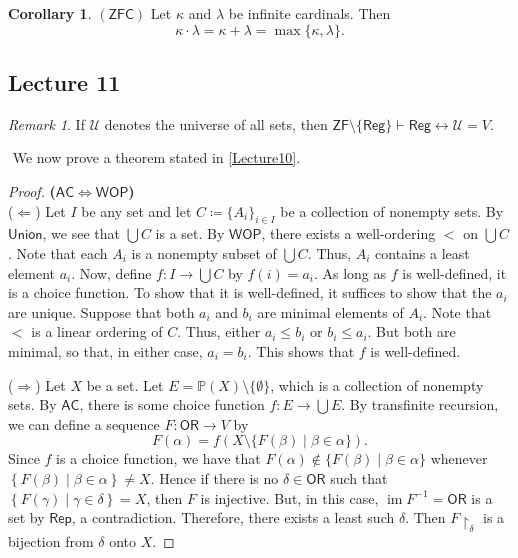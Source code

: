 \documentclass[10pt,letterpaper,cm]{nupset}
\theoremstyle{definition}
\theoremstyle{theorem}
\newtheorem{corollary}[definition]{Corollary}
\theoremstyle{remark}
\newtheorem{remark}[definition]{Remark}
\newcommand{\U}{\mathcal U}
\renewcommand{\P}{\mathbb P}
\newcommand{\1}{\mathbf{1}}
\newcommand{\0}{\vec 0}
\newcommand{\zf}{\mathsf{ZF}}
\newcommand{\zfc}{\mathsf{ZFC}}
\newcommand{\ac}{\mathsf{AC}}
\newcommand{\ord}{\mathsf{OR}}
\DeclareMathOperator{\im}{im}
\begin{document}
\begin{corollary}{$(\zfc)$}
Let $\kappa$ and $\lambda$ be infinite cardinals.
Then $$\kappa \cdot \lambda = \kappa + \lambda = \max\{\kappa, \lambda\}.$$
\end{corollary}

\subsection{Lecture 11}

\begin{remark}
If $\U$ denotes the universe of all sets, then $\zf \setminus \{\mathsf{Reg}\} \vdash \mathsf{Reg} \leftrightarrow \U = V$.
\end{remark}$ $
We now prove a theorem stated in \cref{Lecture10}.

\begin{proof}{\textbf{($\ac \iff \mathsf{WOP}$)}}$ $\\ 
($\Longleftarrow$) Let $I$ be any set and let $C\coloneqq \{A_i\}_{i\in I}$ be a collection of nonempty sets. By  $\mathsf{Union}$, we see that $\bigcup C$ is a set. By $\mathsf{WOP}$, there exists a well-ordering $<$ on $\bigcup C$. Note that each $A_i$ is a nonempty subset of $\bigcup C$. Thus, $A_i$ contains a least element $a_i$. Now, define $f: I \rightarrow \bigcup C$ by $f(i)=a_i$. As long as $f$ is well-defined, it is a choice function. To show that it is well-defined, it suffices to show that the $a_i$ are unique. Suppose that both $a_i$ and $b_i$ are minimal elements of $A_i$. Note  that $<$ is a linear ordering of $C$. Thus, either $a_i \leq b_i$ or $b_i\leq a_i$. But both are minimal, so that, in either case, $a_i=b_i$. This shows that $f$ is well-defined.

\smallskip

($\Longrightarrow$) Let $X$ be a set. Let $E = \P(X) \setminus \{\emptyset\}$, which is a collection of nonempty sets. By $\ac$, there is some choice function $f : E \to \bigcup{E}$.  By transfinite recursion, we can define a sequence $F : \ord \to V$ by 
$$ F(\alpha) = f(X \setminus \{F(\beta) \mid \beta \in \alpha \})   .$$ Since $f$ is a choice function, we have that $F(\alpha) \notin \{F(\beta) \mid \beta \in \alpha\}$ whenever $\left\{F(\beta) \mid \beta \in \alpha\right\} \ne X$. Hence if there is no $\delta \in \ord$ such that $\left\{F(\gamma) \mid \gamma \in \delta\right\} =X$, then $F$ is injective. But, in this case, $\im{F^{-1}} = \ord$ is a set by $\mathsf{Rep}$, a contradiction. Therefore, there exists a least such $\delta$. Then $F\restriction_{\delta}$ is a bijection from $\delta$ onto $X$.
\end{proof}
\end{document}
